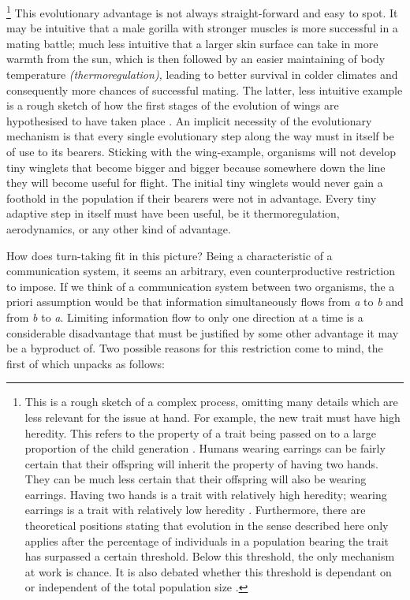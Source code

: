 \footnote{This is a rough sketch of a complex process, omitting many details which are less relevant for the issue at hand.
For example, the new trait must have high heredity. This refers to the property of a trait being passed on to a large proportion of the child generation \citep{king_heredity_2013}.
Humans wearing earrings can be fairly certain that their offspring will inherit the property of having two hands.
They can be much less certain that their offspring will also be wearing earrings.
Having two hands is a trait with relatively high heredity; wearing earrings is a trait with relatively low heredity \citep[]{sapolsky_behave_2017}.
Furthermore, there are theoretical positions stating that evolution in the sense described here only applies after the percentage of individuals in a population bearing the trait has surpassed a certain threshold.
Below this threshold, the only mechanism at work is chance.
It is also debated whether this threshold is dependant on or independent of the total population size \citep[,]{berwick_why_2016,gillespie_population_2010}.}
This evolutionary advantage is not always straight-forward and easy to spot.
It may be intuitive that a male gorilla with stronger muscles is more successful in a mating battle; much less intuitive that a larger skin surface can take in more warmth from the sun, which is then followed by an easier maintaining of body temperature \emph{(thermoregulation),} leading to better survival in colder climates and consequently more chances of successful mating.
The latter, less intuitive example is a rough sketch of how the first stages of the evolution of wings are hypothesised to have taken place \citep{douglas_thermoregulatory_1981,kingsolver_aerodynamics_1985}.
An implicit necessity of the evolutionary mechanism is that every single evolutionary step along the way must in itself be of use to its bearers.
Sticking with the wing-example, organisms will not develop tiny winglets that become bigger and bigger because somewhere down the line they will become useful for flight.
The initial tiny winglets would never gain a foothold in the population if their bearers were not in advantage.
Every tiny adaptive step in itself must have been useful, be it thermoregulation, aerodynamics, or any other kind of advantage.

How does turn-taking fit in this picture?
Being a characteristic of a communication system, it seems an arbitrary, even counterproductive restriction to impose.
If we think of a communication system between two organisms, the a priori assumption would be that information simultaneously flows from \emph{a} to \emph{b} and from \emph{b} to \emph{a}.
Limiting information flow to only one direction at a time is a considerable disadvantage that must be justified by some other advantage it may be a byproduct of.
Two possible reasons for this restriction come to mind, the first of which unpacks as follows:

